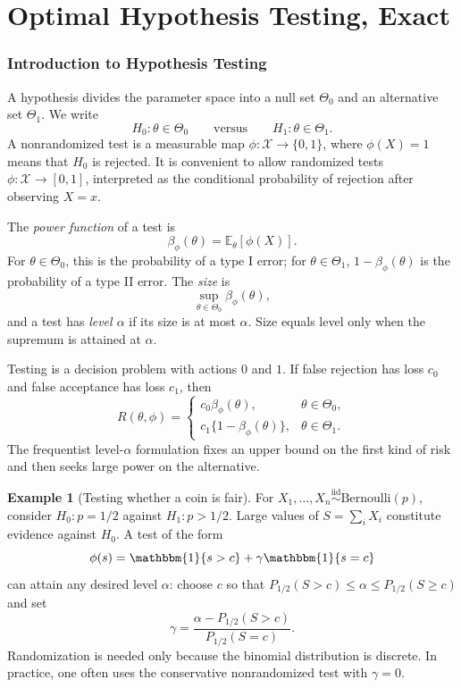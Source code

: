 \documentclass[12pt,oneside]{book}
\numberwithin{equation}{section}
\theoremstyle{definition}
\newtheorem{example}{Example}[section]
\theoremstyle{plain}
\theoremstyle{remark}
\newcommand{\E}{\mathbb{E}}
\newcommand{\ind}{\mathbbm{1}}
\newcommand{\iid}{\overset{\text{iid}}{\sim}}
\newcommand{\Bern}{\mathrm{Bernoulli}}
\begin{document}
\part{Optimal Hypothesis Testing, Exact}

\section{Introduction to Hypothesis Testing}

A hypothesis divides the parameter space into a null set $\Theta_0$ and an
alternative set $\Theta_1$.  We write
\[
    H_0:\theta\in\Theta_0
    \qquad\text{versus}\qquad
    H_1:\theta\in\Theta_1.
\]
A nonrandomized test is a measurable map $\phi:\mathcal X\to\{0,1\}$, where
$\phi(X)=1$ means that $H_0$ is rejected.  It is convenient to allow
randomized tests $\phi:\mathcal X\to[0,1]$, interpreted as the conditional
probability of rejection after observing $X=x$.

The \emph{power function} of a test is
\begin{equation}
    \beta_\phi(\theta)=\E_\theta[\phi(X)].
    \label{eq:power-function}
\end{equation}
For $\theta\in\Theta_0$, this is the probability of a type I error; for
$\theta\in\Theta_1$, $1-\beta_\phi(\theta)$ is the probability of a type II
error.  The \emph{size} is
\[
    \sup_{\theta\in\Theta_0}\beta_\phi(\theta),
\]
and a test has \emph{level $\alpha$} if its size is at most $\alpha$.  Size
equals level only when the supremum is attained at $\alpha$.

Testing is a decision problem with actions $0$ and $1$.  If false rejection
has loss $c_0$ and false acceptance has loss $c_1$, then
\[
 R(\theta,\phi)=
 \begin{cases}
   c_0\beta_\phi(\theta),&\theta\in\Theta_0,\\
   c_1\{1-\beta_\phi(\theta)\},&\theta\in\Theta_1.
 \end{cases}
\]
The frequentist level-$\alpha$ formulation fixes an upper bound on the first
kind of risk and then seeks large power on the alternative.

\begin{example}[Testing whether a coin is fair]
For $X_1,\ldots,X_n\iid\Bern(p)$, consider
$H_0:p=1/2$ against $H_1:p>1/2$.  Large values of
$S=\sum_iX_i$ constitute evidence against $H_0$.  A test of the form
\[
    \phi(s)=\ind\{s>c\}+\gamma\ind\{s=c\}
\]
can attain any desired level $\alpha$: choose $c$ so that
$P_{1/2}(S>c)\leq\alpha\leq P_{1/2}(S\geq c)$ and set
\[
    \gamma=\frac{\alpha-P_{1/2}(S>c)}{P_{1/2}(S=c)}.
\]
Randomization is needed only because the binomial distribution is discrete.
In practice, one often uses the conservative nonrandomized test with
$\gamma=0$.
\end{example}
\end{document}
